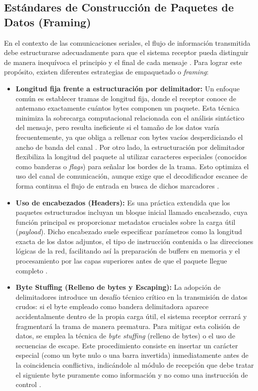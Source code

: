 \documentclass[journal]{IEEEtran}
\begin{document}
\subsection{Estándares de Construcción de Paquetes de Datos (Framing)}
En el contexto de las comunicaciones seriales, el flujo de información transmitida debe estructurarse adecuadamente para que el sistema receptor pueda distinguir de manera inequívoca el principio y el final de cada mensaje \cite{tanenbaum2012}. Para lograr este propósito, existen diferentes estrategias de empaquetado o \textit{framing}:
\begin{itemize}
    \item \textbf{Longitud fija frente a estructuración por delimitador:} Un enfoque común es establecer tramas de longitud fija, donde el receptor conoce de antemano exactamente cuántos bytes componen un paquete. Esta técnica minimiza la sobrecarga computacional relacionada con el análisis sintáctico del mensaje, pero resulta ineficiente si el tamaño de los datos varía frecuentemente, ya que obliga a rellenar con bytes vacíos desperdiciando el ancho de banda del canal \cite{stallings2004}. Por otro lado, la estructuración por delimitador flexibiliza la longitud del paquete al utilizar caracteres especiales (conocidos como banderas o \textit{flags}) para señalar los bordes de la trama. Esto optimiza el uso del canal de comunicación, aunque exige que el decodificador escanee de forma continua el flujo de entrada en busca de dichos marcadores \cite{tanenbaum2012}.
    
    \item \textbf{Uso de encabezados (Headers):} Es una práctica extendida que los paquetes estructurados incluyan un bloque inicial llamado encabezado, cuya función principal es proporcionar metadatos cruciales sobre la carga útil (\textit{payload}). Dicho encabezado suele especificar parámetros como la longitud exacta de los datos adjuntos, el tipo de instrucción contenida o las direcciones lógicas de la red, facilitando así la preparación de buffers en memoria y el procesamiento por las capas superiores antes de que el paquete llegue completo \cite{stallings2004}.
    
    \item \textbf{Byte Stuffing (Relleno de bytes y Escaping):} La adopción de delimitadores introduce un desafío técnico crítico en la transmisión de datos crudos: si el byte empleado como bandera delimitadora aparece accidentalmente dentro de la propia carga útil, el sistema receptor cerrará y fragmentará la trama de manera prematura. Para mitigar esta colisión de datos, se emplea la técnica de \textit{byte stuffing} (relleno de bytes) o el uso de secuencias de escape. Este procedimiento consiste en insertar un carácter especial (como un byte nulo o una barra invertida) inmediatamente antes de la coincidencia conflictiva, indicándole al módulo de recepción que debe tratar el siguiente byte puramente como información y no como una instrucción de control \cite{tanenbaum2012}.
\end{itemize}
\end{document}
